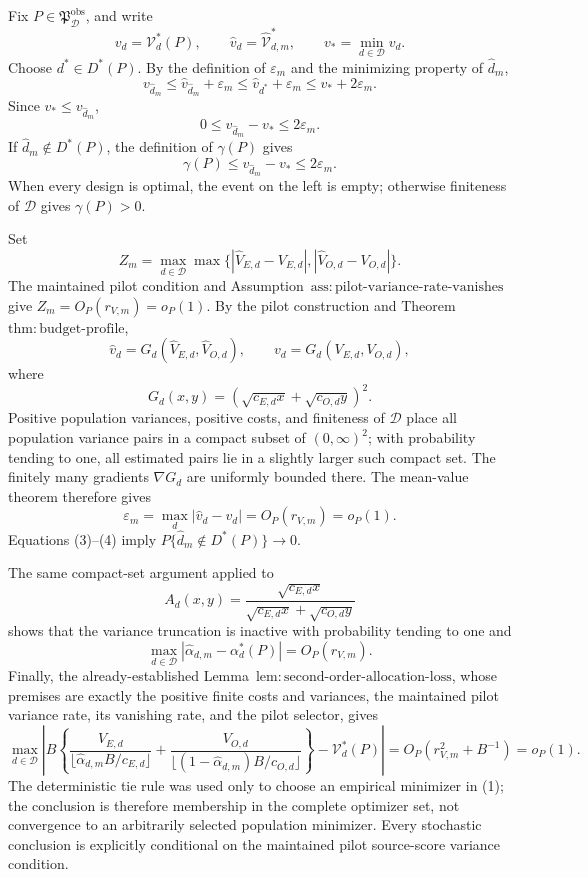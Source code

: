 Fix \(P\in\mathfrak P_{\mathcal D}^{\mathrm{obs}}\), and write
\[
 v_d=\mathcal V_d^*(P),
 \qquad
 \widehat v_d=\widehat{\mathcal V}_{d,m}^*,
 \qquad
 v_* =\min_{d\in\mathcal D}v_d.
\]
Choose \(d^*\in D^*(P)\).  By the definition of \(\varepsilon_m\) and the minimizing property of \(\widehat d_m\),
\[
 v_{\widehat d_m}
 \le \widehat v_{\widehat d_m}+\varepsilon_m
 \le \widehat v_{d^*}+\varepsilon_m
 \le v_*+2\varepsilon_m.                                \tag{1}
\]
Since \(v_*\le v_{\widehat d_m}\),
\[
 0\le v_{\widehat d_m}-v_*\le2\varepsilon_m.            \tag{2}
\]
If \(\widehat d_m\notin D^*(P)\), the definition of \(\gamma(P)\) gives
\[
 \gamma(P)\le v_{\widehat d_m}-v_*\le2\varepsilon_m.    \tag{3}
\]
When every design is optimal, the event on the left is empty; otherwise finiteness of \(\mathcal D\) gives \(\gamma(P)>0\).

Set
\[
 Z_m=\max_{d\in\mathcal D}\max\{|\widehat V_{E,d}-V_{E,d}|,
 |\widehat V_{O,d}-V_{O,d}|\}.
\]
The maintained pilot condition and Assumption~\(\mathrm{ass{:}pilot\text{-}variance\text{-}rate\text{-}vanishes}\) give \(Z_m=O_P(r_{V,m})=o_P(1)\).  By the pilot construction and Theorem~\(\mathrm{thm{:}budget\text{-}profile}\),
\[
 \widehat v_d=G_d(\widehat V_{E,d},\widehat V_{O,d}),
 \qquad
 v_d=G_d(V_{E,d},V_{O,d}),
\]
where
\[
 G_d(x,y)=(\sqrt{c_{E,d}x}+\sqrt{c_{O,d}y})^2.
\]
Positive population variances, positive costs, and finiteness of \(\mathcal D\) place all population variance pairs in a compact subset of \((0,\infty)^2\); with probability tending to one, all estimated pairs lie in a slightly larger such compact set.  The finitely many gradients \(\nabla G_d\) are uniformly bounded there.  The mean-value theorem therefore gives
\[
 \varepsilon_m=\max_d|\widehat v_d-v_d|=O_P(r_{V,m})=o_P(1). \tag{4}
\]
Equations (3)--(4) imply \(P\{\widehat d_m\notin D^*(P)\}\to0\).

The same compact-set argument applied to
\[
 A_d(x,y)=\frac{\sqrt{c_{E,d}x}}
 {\sqrt{c_{E,d}x}+\sqrt{c_{O,d}y}}
\]
shows that the variance truncation is inactive with probability tending to one and
\[
 \max_{d\in\mathcal D}|\widehat\alpha_{d,m}-\alpha_d^*(P)|
 =O_P(r_{V,m}).                                           \tag{5}
\]
Finally, the already-established Lemma~\(\mathrm{lem{:}second\text{-}order\text{-}allocation\text{-}loss}\), whose premises are exactly the positive finite costs and variances, the maintained pilot variance rate, its vanishing rate, and the pilot selector, gives
\[
\max_{d\in\mathcal D}\left|B\left\{
\frac{V_{E,d}}{\lfloor\widehat\alpha_{d,m}B/c_{E,d}\rfloor}
+\frac{V_{O,d}}{\lfloor(1-\widehat\alpha_{d,m})B/c_{O,d}\rfloor}
\right\}-\mathcal V_d^*(P)\right|
=O_P(r_{V,m}^2+B^{-1})=o_P(1).
\]
The deterministic tie rule was used only to choose an empirical minimizer in (1); the conclusion is therefore membership in the complete optimizer set, not convergence to an arbitrarily selected population minimizer.  Every stochastic conclusion is explicitly conditional on the maintained pilot source-score variance condition.